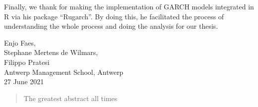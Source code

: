 \documentclass[a4paper, twoside]{templates/ociamthesis}
\begin{document}
\begin{romanpages}
\begin{acknowledgements}
  \noindent Finally, we thank \textcite{alexios2020} for making the implementation of GARCH models integrated in R via his package ``Rugarch''. By doing this, he facilitated the process of understanding the whole process and doing the analysis for our thesis. ~\\

  \begin{flushright}
  Enjo Faes, \\
  Stephane Mertens de Wilmars, \\
  Filippo Pratesi \\
  Antwerp Management School, Antwerp \\
  27 June 2021
  \end{flushright}
\end{acknowledgements}


\begin{abstract}
	The greatest abstract all times
\end{abstract}


\flushbottom

\tableofcontents

\listoffigures
	\mtcaddchapter

\listoftables
  \mtcaddchapter


\end{romanpages}

\flushbottom
\end{document}
